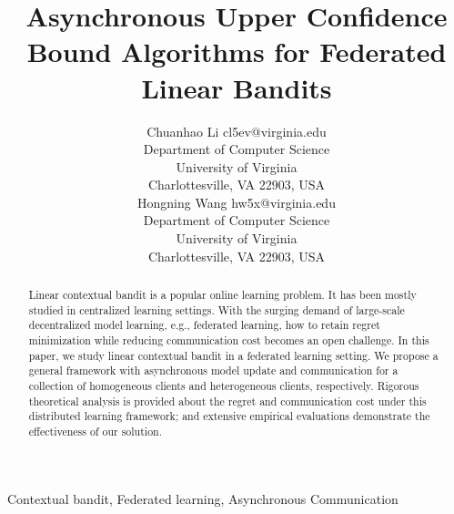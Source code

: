 \documentclass[twoside,10pt]{article}
\begin{document}
\title{Asynchronous Upper Confidence Bound Algorithms for Federated Linear Bandits}

\author{\name Chuanhao Li \email cl5ev@virginia.edu \\
       \addr Department of Computer Science\\
       University of Virginia\\
       Charlottesville, VA 22903, USA\\
       \AND
       \name Hongning Wang \email hw5x@virginia.edu \\
       \addr Department of Computer Science\\
       University of Virginia\\
       Charlottesville, VA 22903, USA
       }


\maketitle

\begin{abstract}%
Linear contextual bandit is a popular online learning problem. It has been mostly studied in centralized learning settings. With the surging demand of large-scale decentralized model learning, e.g., federated learning, how to retain regret minimization while reducing communication cost becomes an open challenge. 
In this paper, we study linear contextual bandit in a federated learning setting. We propose a general framework with asynchronous model update and communication for a collection of homogeneous clients and heterogeneous clients, respectively. Rigorous theoretical analysis is provided about the regret and communication cost under this distributed learning framework; and extensive empirical evaluations demonstrate the effectiveness of our solution.
\end{abstract}

\begin{keywords}
  Contextual bandit, Federated learning, Asynchronous Communication
\end{keywords}





\end{document}
